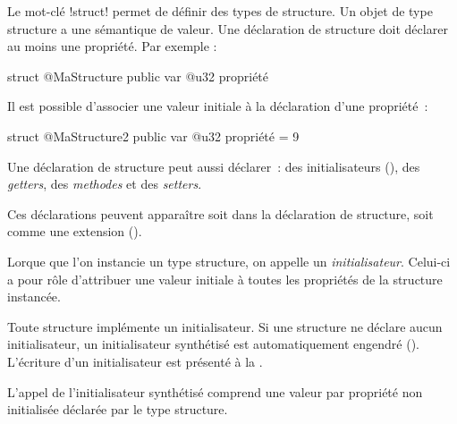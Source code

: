 




Le mot-clé \ggsq!struct! permet de définir des types de structure. Un objet de type structure a une sémantique de valeur. Une déclaration de structure doit déclarer au moins une propriété. Par exemple :

\begin{galgas4}
struct @MaStructure {
  public var @u32 propriété
}
\end{galgas4}

Il est possible d'associer une valeur initiale à la déclaration d'une propriété~:
\begin{galgas4}
struct @MaStructure2 {
  public var @u32 propriété = 9
}
\end{galgas4}

Une déclaration de structure peut aussi déclarer~: des initialisateurs (), des \emph{getters}, des \emph{methodes} et des \emph{setters}.

Ces déclarations peuvent apparaître soit dans la déclaration de structure, soit comme une extension ().













Lorque que l'on instancie un type structure, on appelle un \emph{initialisateur}. Celui-ci a pour rôle d'attribuer une valeur initiale à toutes les propriétés de la structure instancée.


Toute structure implémente un initialisateur. Si une structure ne déclare aucun initialisateur, un initialisateur synthétisé est automatiquement engendré (). L'écriture d'un initialisateur est présenté à la .


L'appel de l'initialisateur synthétisé comprend une valeur par propriété non initialisée déclarée par le type structure.


